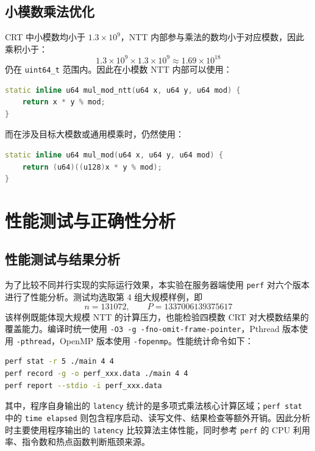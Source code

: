 \documentclass[a4paper]{article}
\begin{document}
\subsection{小模数乘法优化}

CRT 中小模数均小于 $1.3\times 10^9$，NTT 内部参与乘法的数均小于对应模数，因此乘积小于：
\[
1.3\times 10^9 \times 1.3\times 10^9 \approx 1.69\times 10^{18}
\]
仍在 \texttt{uint64\_t} 范围内。因此在小模数 NTT 内部可以使用：

\begin{lstlisting}[title=小模数 NTT 乘法,frame=trbl,language={C++}]
static inline u64 mul_mod_ntt(u64 x, u64 y, u64 mod) {
    return x * y % mod;
}
\end{lstlisting}

而在涉及目标大模数或通用模乘时，仍然使用：

\begin{lstlisting}[title=通用安全模乘,frame=trbl,language={C++}]
static inline u64 mul_mod(u64 x, u64 y, u64 mod) {
    return (u64)((u128)x * y % mod);
}
\end{lstlisting}

\section{性能测试与正确性分析}

\subsection{性能测试与结果分析}

为了比较不同并行实现的实际运行效果，本实验在服务器端使用 \texttt{perf} 对六个版本进行了性能分析。测试均选取第 4 组大规模样例，即
\[
n=131072,\qquad P=1337006139375617
\]
该样例既能体现大规模 NTT 的计算压力，也能检验四模数 CRT 对大模数结果的覆盖能力。编译时统一使用 \texttt{-O3 -g -fno-omit-frame-pointer}，Pthread 版本使用 \texttt{-pthread}，OpenMP 版本使用 \texttt{-fopenmp}。性能统计命令如下：

\begin{lstlisting}[language=bash]
perf stat -r 5 ./main 4 4
perf record -g -o perf_xxx.data ./main 4 4
perf report --stdio -i perf_xxx.data
\end{lstlisting}

其中，程序自身输出的 \texttt{latency} 统计的是多项式乘法核心计算区域；\texttt{perf stat} 中的 \texttt{time elapsed} 则包含程序启动、读写文件、结果检查等额外开销。因此分析时主要使用程序输出的 \texttt{latency} 比较算法主体性能，同时参考 \texttt{perf} 的 CPU 利用率、指令数和热点函数判断瓶颈来源。
\end{document}

